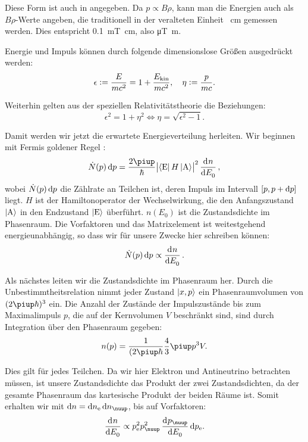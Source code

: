 Diese Form ist auch in \parencite[§2.232]{Riezler/Kernphysikalisches}
angegeben. Da $p \propto B\rho$, kann man die Energien auch als $B\rho$-Werte
angeben, die traditionell in der veralteten Einheit \si{\gauss\centi\meter}
gemessen werden. Dies entspricht \SI{0.1}{\milli\tesla\centi\meter}, also
\si{\micro\tesla\meter}.
    
Energie und Impuls können durch folgende dimensionslose Größen ausgedrückt
werden: \parencite[(132) und (133)]{Riezler/Kernphysikalisches}
\[
    \epsilon := \frac{E}{m c^2} = 1 + \frac{E_\text{kin}}{m c^2}
    ,\quad
    \eta := \frac{p}{m c}.
\]

Weiterhin gelten aus der speziellen Relativitätstheorie die Beziehungen:
\parencite[(134)]{Riezler/Kernphysikalisches}
\[
    \epsilon^2 = 1 + \eta^2
    \iff
    \eta = \sqrt{\epsilon^2 - 1}.
\]

Damit werden wir jetzt die erwartete Energieverteilung herleiten. Wir beginnen
mit Fermis goldener Regel \parencite[Seite~9]{Hof/Poltergeist}:
\[
    \dot N(p) \dif p = \frac{2\piup}{\hbar} \abs{\bra{\text E} H \ket{\text A}}^2 \dod n{E_0},
\]
wobei $\dot N(p) \dif p$ die Zählrate an Teilchen ist, deren Impuls im
Intervall $[p, p + \dif p]$ liegt. $H$ ist der Hamiltonoperator der
Wechselwirkung, die den Anfangszustand $\ket{\text A}$ in den Endzustand
$\ket{\text E}$ überführt. $n(E_0)$ ist die Zustandsdichte im Phasenraum. Die
Vorfaktoren und das Matrixelement ist weitestgehend energieunabhängig, so dass
wir für unsere Zwecke hier schreiben können:
\[
    \dot N(p) \dif p \propto \dod n{E_0}.
\]

Als nächstes leiten wir die Zustandsdichte im Phasenraum her. Durch die
Unbestimmtheitsrelation nimmt jeder Zustand $\ket{x, p}$ ein Phasenraumvolumen
von $(2\piup\hbar)^3$ ein. Die Anzahl der Zustände der Impulszustände bis zum
Maximalimpuls $p$, die auf der Kernvolumen $V$ beschränkt sind, sind durch
Integration über den Phasenraum gegeben:
\[
    n(p) = \frac{1}{(2\piup\hbar} \frac 43 \piup p^3 V.
\]

Dies gilt für jedes Teilchen. Da wir hier Elektron und Antineutrino betrachten
müssen, ist unsere Zustandsdichte das Produkt der zwei Zustandsdichten, da der
gesamte Phasenraum das kartesische Produkt der beiden Räume ist. Somit erhalten
wir mit $\dif n = \dif n_{\text e} \dif n_\nuup$, bis auf Vorfaktoren:
\[
    \dod n{E_0} \propto p_{\text e}^2 p_\nuup^2 \dod{p_\nuup}{E_0} \dif
    p_{\text e}.
\]

